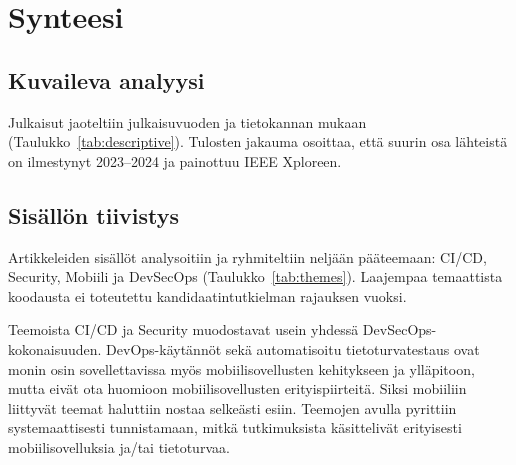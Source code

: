 \documentclass[bscthesis,finnish,oneside,biblatex]{uefcsthesis}
\begin{document}
    \section{Synteesi}
    \label{sec:synthesis}


    \subsection{Kuvaileva analyysi}
    Julkaisut jaoteltiin julkaisuvuoden ja tietokannan mukaan
    (Taulukko~\ref{tab:descriptive}). Tulosten jakauma osoittaa, että suurin osa lähteistä on ilmestynyt 2023–2024 ja painottuu IEEE Xploreen.

    \subsection{Sisällön tiivistys}
    Artikkeleiden sisällöt analysoitiin ja ryhmiteltiin neljään pääteemaan: CI/CD, Security, Mobiili ja DevSecOps (Taulukko~\ref{tab:themes}). Laajempaa temaattista koodausta ei toteutettu kandidaatintutkielman rajauksen vuoksi.

    Teemoista CI/CD ja Security muodostavat usein yhdessä DevSecOps-kokonaisuuden. DevOps-käytännöt sekä automatisoitu tietoturvatestaus ovat monin osin sovellettavissa myös mobiilisovellusten kehitykseen ja ylläpitoon, mutta eivät ota huomioon mobiilisovellusten erityispiirteitä. Siksi mobiiliin liittyvät teemat haluttiin nostaa selkeästi esiin. Teemojen avulla pyrittiin systemaattisesti tunnistamaan, mitkä tutkimuksista käsittelivät erityisesti mobiilisovelluksia ja/tai tietoturvaa.
\end{document}

